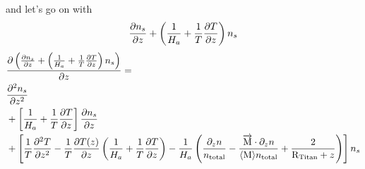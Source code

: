 and let's go on with
\[
\frac{\partial n_s}{\partial z} + \left(\frac{1}{H_a} + \frac{1}{T}\frac{\partial T}{\partial z}\right)n_s
\]
\begin{equation}
\begin{split}
& \frac{\partial\left(\frac{\partial n_s}{\partial z} + \left(\frac{1}{H_a} + \frac{1}{T}\frac{\partial T}{\partial z}\right)n_s\right)}{\partial z} = \\
& \frac{\partial^2n_s}{\partial{z}^2} \\
& + \left[\frac{1}{H_a} + \frac{1}{T}\frac{\partial T}{\partial z}\right]\frac{\partial n_s}{\partial z} \\
& + \left[ \frac{1}{T}\frac{\partial^2T}{\partial{z}^2} 
          - \frac{1}{T}\frac{\partial T(z)}{\partial z}\left(\frac{1}{H_a}
                                           + \frac{1}{T}\frac{\partial T}{\partial z}
                                     \right)
           -\frac{1}{H_a}
                             \left(
                                  \frac{\partial_{z}{n}}{n_\text{total}}
                                - \frac{\overrightarrow{\text{M}}\cdot\partial_{z}{n}}{\langle\text{M}\rangle n_\text{total}}
                                + \frac{2}{\text{R}_\text{Titan} + z} 
                            \right)
     \right]n_s \\
\end{split}
\label{Titan:diff_deriv_K_fac}
\end{equation}
